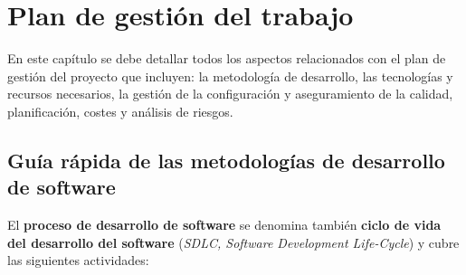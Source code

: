 \chapter{Plan de gestión del trabajo}\label{cap:Planificacion}
En este capítulo se debe detallar todos los aspectos relacionados con el plan de gestión del proyecto que incluyen: la metodología de desarrollo, las tecnologías y recursos necesarios, la gestión de la configuración y aseguramiento de la calidad, planificación, costes y análisis de riesgos.




\section{Guía rápida de las metodologías de desarrollo de software}
El \textbf{proceso de desarrollo de software} se denomina también \textbf{ciclo de vida del desarrollo del software} (\emph{SDLC, Software Development Life-Cycle}) y cubre las siguientes actividades:

